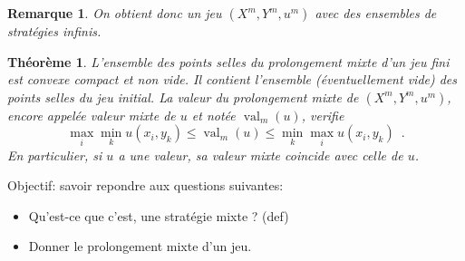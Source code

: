 \documentclass[11pt]{scrartcl}
\theoremstyle{mydefinition}
\newtheorem{rem}[definition]{Remarque}
\theoremstyle{myplain}
\newtheorem{thm}[definition]{Th\'eor\`eme}
\DeclareMathOperator{\val}{val}
\begin{document}
\begin{rem}
 On obtient donc un jeu $(X^m,Y^m,u^m)$ avec des ensembles de strat\'egies \emph{infinis}.
\end{rem}

\begin{thm}
 L'ensemble des points selles du prolongement mixte d'un jeu fini est convexe compact et \emph{non vide}.
 Il contient l'ensemble (\'eventuellement vide) des points selles du jeu initial.
 La valeur du prolongement mixte de $(X^m, Y^m, u^m)$, encore appel\'ee valeur mixte de $u$ et not\'ee $\val_m(u)$, verifie
   \[ \max_i \min_k u(x_i,y_k) \leq \val_m(u) \leq \min_k \max_i u(x_i, y_k)  \enspace . \]
 En particulier, si $u$ a une valeur, sa valeur mixte coincide avec celle de $u$.
\end{thm}






Objectif: savoir repondre aux questions suivantes:


\begin{itemize}
 \item Qu'est-ce que c'est, une strat\'egie mixte ? (def)
 \item Donner le prolongement mixte d'un jeu.
                                           
\end{itemize}
\end{document}
